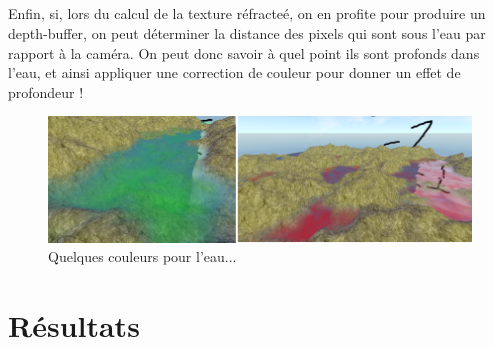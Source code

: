 \documentclass{EPUProjetDi}
\begin{document}
\paragraph{}
Enfin, si, lors du calcul de la texture réfracteé, on en profite pour produire un depth-buffer, on peut déterminer la distance des pixels qui sont sous l'eau par rapport à la caméra. On peut donc savoir à quel point ils sont profonds dans l'eau, et ainsi appliquer
une correction de couleur pour donner un effet de profondeur !


\begin{figure}[h]
	\centering
	\includegraphics[scale=.5]{water_colors}
	\caption{Quelques couleurs pour l'eau...}
	\label{fig:water_colors}
\end{figure}



\chapter{Résultats}
\end{document}

